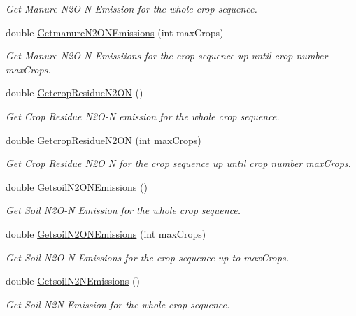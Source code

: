 \begin{DoxyCompactItemize}
\begin{DoxyCompactList}\small\item\em Get Manure N2\+O-\/N Emission for the whole crop sequence. \end{DoxyCompactList}\item 
double \mbox{\hyperlink{class_crop_sequence_class_a6483d720e357417e677ef60d3dd926dc}{Getmanure\+N2\+O\+N\+Emissions}} (int max\+Crops)
\begin{DoxyCompactList}\small\item\em Get Manure N2O N Emissiions for the crop sequence up until crop number max\+Crops. \end{DoxyCompactList}\item 
double \mbox{\hyperlink{class_crop_sequence_class_ad153a07bfea03b639bfa702d109ec759}{Getcrop\+Residue\+N2\+ON}} ()
\begin{DoxyCompactList}\small\item\em Get Crop Residue N2\+O-\/N emission for the whole crop sequence. \end{DoxyCompactList}\item 
double \mbox{\hyperlink{class_crop_sequence_class_a692e23e3e0d64b9b5932cea101d1534b}{Getcrop\+Residue\+N2\+ON}} (int max\+Crops)
\begin{DoxyCompactList}\small\item\em Get Crop Residue N2O N for the crop sequence up until crop number max\+Crops. \end{DoxyCompactList}\item 
double \mbox{\hyperlink{class_crop_sequence_class_a25fe9085ff4966e87375b1cee8b959e0}{Getsoil\+N2\+O\+N\+Emissions}} ()
\begin{DoxyCompactList}\small\item\em Get Soil N2\+O-\/N Emission for the whole crop sequence. \end{DoxyCompactList}\item 
double \mbox{\hyperlink{class_crop_sequence_class_a61d3f67fda6f158732ab8379a6e25c5f}{Getsoil\+N2\+O\+N\+Emissions}} (int max\+Crops)
\begin{DoxyCompactList}\small\item\em Get Soil N2O N Emissions for the crop sequence up to max\+Crops. \end{DoxyCompactList}\item 
double \mbox{\hyperlink{class_crop_sequence_class_a5bd7053c09e78daefbaa5affdbf7071d}{Getsoil\+N2\+N\+Emissions}} ()
\begin{DoxyCompactList}\small\item\em Get Soil N2N Emission for the whole crop sequence. \end{DoxyCompactList}\item 

\end{DoxyCompactItemize}
